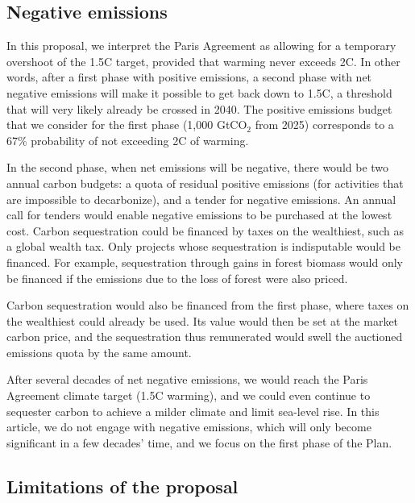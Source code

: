 \documentclass[12pt,english]{article}
\begin{document}
\subsection{Negative emissions\label{subsec:negative_emissions}}

In this proposal, we interpret the Paris Agreement as allowing for a temporary overshoot of the 1.5\textdegree{}C target, provided that warming never exceeds 2\textdegree{}C. In other words, after a first phase with positive emissions, a second phase with net negative emissions will make it possible to get back down to 1.5\textdegree{}C, a threshold that will very likely already be crossed in 2040.\citep{diffenbaugh_data-driven_2023} 
The positive emissions budget that we consider for the first phase (1,000 GtCO$_\text{2}$ from 2025) corresponds to a 67\% probability of not exceeding 2\textdegree{}C of warming. 

In the second phase, when net emissions will be negative, there would be two annual carbon budgets: a quota of residual positive emissions (for activities that are impossible to decarbonize), and a tender for negative emissions. An annual call for tenders would enable negative emissions to be purchased at the lowest cost. Carbon sequestration could be financed by taxes on the wealthiest, such as a global wealth tax. Only projects whose sequestration is indisputable would be financed. For example, sequestration through gains in forest biomass would only be financed if the emissions due to the loss of forest were also priced. 

Carbon sequestration would also be financed from the first phase, where taxes on the wealthiest could already be used. Its value would then be set at the market carbon price, and the sequestration thus remunerated would swell the auctioned emissions quota by the same amount.\citep{edenhofer_governance_2023} 

After several decades of net negative emissions, we would reach the Paris Agreement climate target (1.5\textdegree{}C warming), and we could even continue to sequester carbon to achieve a milder climate and limit sea-level rise. In this article, we do not engage with negative emissions, which will only become significant in a few decades' time, and we focus on the first phase of the Plan. 


\subsection{Limitations of the proposal\label{subsec:limitation}}
\end{document}
